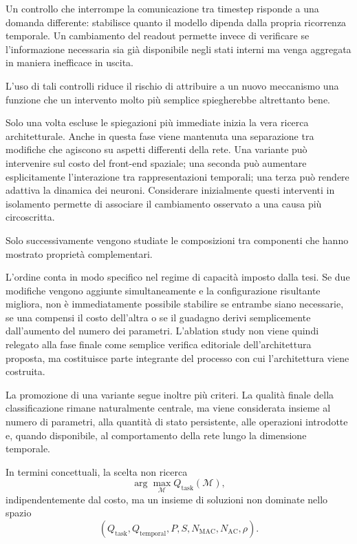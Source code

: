 Un controllo che interrompe la comunicazione tra timestep risponde a una domanda differente: stabilisce quanto il modello dipenda dalla propria ricorrenza temporale. Un cambiamento del readout permette invece di verificare se l'informazione necessaria sia già disponibile negli stati interni ma venga aggregata in maniera inefficace in uscita.

L'uso di tali controlli riduce il rischio di attribuire a un nuovo meccanismo una funzione che un intervento molto più semplice spiegherebbe altrettanto bene.

Solo una volta escluse le spiegazioni più immediate inizia la vera ricerca architetturale. Anche in questa fase viene mantenuta una separazione tra modifiche che agiscono su aspetti differenti della rete. Una variante può intervenire sul costo del front-end spaziale; una seconda può aumentare esplicitamente l'interazione tra rappresentazioni temporali; una terza può rendere adattiva la dinamica dei neuroni. Considerare inizialmente questi interventi in isolamento permette di associare il cambiamento osservato a una causa più circoscritta.

Solo successivamente vengono studiate le composizioni tra componenti che hanno mostrato proprietà complementari.

L'ordine conta in modo specifico nel regime di capacità imposto dalla tesi. Se due modifiche vengono aggiunte simultaneamente e la configurazione risultante migliora, non è immediatamente possibile stabilire se entrambe siano necessarie, se una compensi il costo dell'altra o se il guadagno derivi semplicemente dall'aumento del numero dei parametri. L'ablation study non viene quindi relegato alla fase finale come semplice verifica editoriale dell'architettura proposta, ma costituisce parte integrante del processo con cui l'architettura viene costruita.

La promozione di una variante segue inoltre più criteri. La qualità finale della classificazione rimane naturalmente centrale, ma viene considerata insieme al numero di parametri, alla quantità di stato persistente, alle operazioni introdotte e, quando disponibile, al comportamento della rete lungo la dimensione temporale.

In termini concettuali, la scelta non ricerca
\begin{equation*}
\arg\max_{\mathcal{M}} Q_{\mathrm{task}}(\mathcal{M}),
\end{equation*}
indipendentemente dal costo, ma un insieme di soluzioni non dominate nello spazio
\begin{equation}
\label{eq:spazio_soluzioni_pareto}
\left( Q_{\mathrm{task}}, Q_{\mathrm{temporal}}, P, S, N_{\mathrm{MAC}}, N_{\mathrm{AC}}, \rho \right).
\end{equation}

